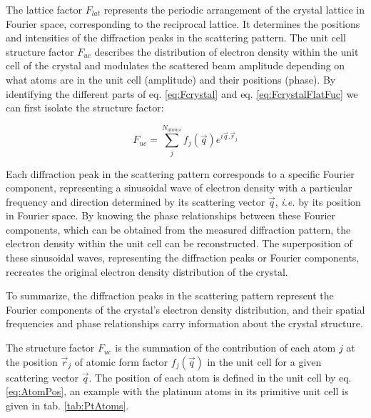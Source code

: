 The lattice factor $F_{lat}$ represents the periodic arrangement of the crystal lattice in Fourier space, corresponding to the reciprocal lattice.
It determines the positions and intensities of the diffraction peaks in the scattering pattern.
The unit cell structure factor $F_{uc}$ describes the distribution of electron density within the unit cell of the crystal and modulates the scattered beam amplitude depending on what atoms are in the unit cell (amplitude) and their positions (phase).
By identifying the different parts of eq. \ref{eq:Fcrystal} and eq. \ref{eq:FcrystalFlatFuc} we can first isolate the structure factor:

\begin{equation}
    \label{eq:StrucFactor}
    F_{uc} = \sum_j^{N_{atoms}} f_j(\vec{q}) e^{i\vec{q}.\vec{r}_j}
\end{equation}

Each diffraction peak in the scattering pattern corresponds to a specific Fourier component, representing a sinusoidal wave of electron density with a particular frequency and direction determined by its scattering vector $\vec{q}$, \textit{i.e.} by its position in Fourier space.
By knowing the phase relationships between these Fourier components, which can be obtained from the measured diffraction pattern, the electron density within the unit cell can be reconstructed.
The superposition of these sinusoidal waves, representing the diffraction peaks or Fourier components, recreates the original electron density distribution of the crystal.

To summarize, the diffraction peaks in the scattering pattern represent the Fourier components of the crystal's electron density distribution, and their spatial frequencies and phase relationships carry information about the crystal structure.

The structure factor $F_{uc}$ is the summation of the contribution of each atom $j$ at the position $\vec{r}_j$ of atomic form factor $f_j(\vec{q})$ in the unit cell for a given scattering vector $\vec{q}$.
The position of each atom is defined in the unit cell by eq. \ref{eq:AtomPos}, an example with the platinum atoms in its primitive unit cell is given in tab. \ref{tab:PtAtoms}.

